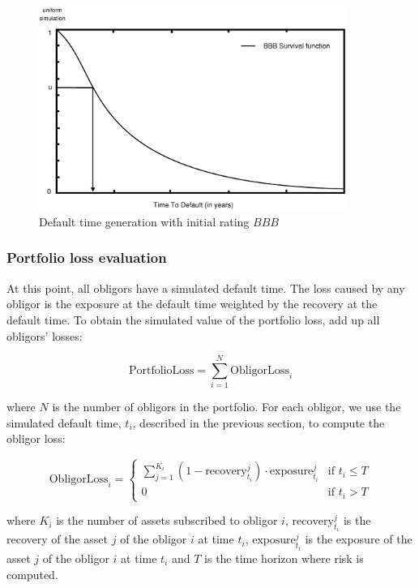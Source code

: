 \documentclass[a4paper,12pt,final]{article}
\begin{document}
\begin{figure}[!hbt]
\begin{center}
\includegraphics[width=10cm,angle=0]{./images/simttd.eps}
\caption{Default time generation with initial rating $BBB$}
\label{simttd}
\end{center}
\end{figure}
\FloatBarrier

\subsubsection{Portfolio loss evaluation}
\label{sec:portfolioloss}
At this point, all obligors have a simulated default time. The loss
caused by any obligor is the exposure at the default time weighted by 
the recovery at the default time. To obtain the simulated value of the 
portfolio loss, add up all obligors' losses:

\begin{displaymath}
\mathrm{PortfolioLoss} = \sum_{i=1}^N \mathrm{ObligorLoss}_i
\end{displaymath}

where $N$ is the number of obligors in the portfolio. For each obligor, we 
use the simulated default time, $t_i$, described in the previous section, to 
compute the obligor loss:

\begin{displaymath}
\mathrm{ObligorLoss}_{i} = \left\{
\begin{array}{ll}
\sum_{j=1}^{K_i} (1 - \mathrm{recovery}_{t_i}^j) \cdot \mathrm{exposure}_{t_i}^j & \textrm{if  } t_i \le T \\
0 & \textrm{if  } t_i > T
\end{array}
\right.
\end{displaymath}

where $K_i$ is the number of assets subscribed to obligor $i$, 
$\mathrm{recovery}_{t_i}^j$ is the recovery of the asset $j$ of the obligor $i$ at time $t_i$,
$\mathrm{exposure}_{t_i}^j$ is the exposure of the asset $j$ of the obligor $i$ at time $t_i$
and $T$ is the time horizon where risk is computed.
\end{document}
